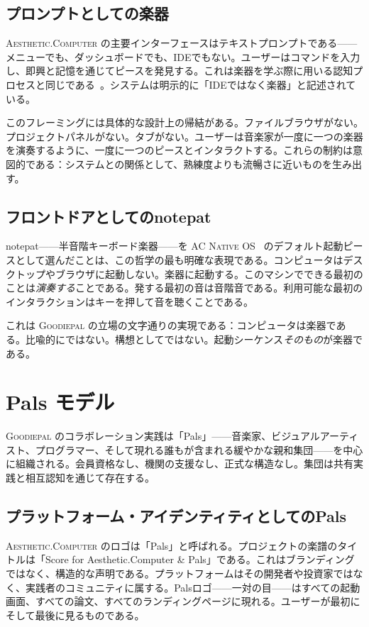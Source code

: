 \documentclass[10pt,letterpaper,twocolumn]{article}
\newcommand{\ac}{\textsc{Aesthetic.Computer}}
\newcommand{\acos}{\textsc{AC Native OS}}
\newcommand{\gp}{\textsc{Goodiepal}}
\begin{document}
\subsection{プロンプトとしての楽器}

\ac{} の主要インターフェースはテキストプロンプトである——メニューでも、ダッシュボードでも、IDEでもない。ユーザーはコマンドを入力し、即興と記憶を通じてピースを発見する。これは楽器を学ぶ際に用いる認知プロセスと同じである~\citep{scudder2026ac}。システムは明示的に「IDEではなく楽器」と記述されている。

このフレーミングには具体的な設計上の帰結がある。ファイルブラウザがない。プロジェクトパネルがない。タブがない。ユーザーは音楽家が一度に一つの楽器を演奏するように、一度に一つのピースとインタラクトする。これらの制約は意図的である：システムとの関係として、熟練度よりも流暢さに近いものを生み出す。

\subsection{フロントドアとしてのnotepat}

notepat——半音階キーボード楽器——を \acos{}~\citep{scudder2026notepat} のデフォルト起動ピースとして選んだことは、この哲学の最も明確な表現である。コンピュータはデスクトップやブラウザに起動しない。楽器に起動する。このマシンでできる最初のことは\emph{演奏する}ことである。発する最初の音は音階音である。利用可能な最初のインタラクションはキーを押して音を聴くことである。

これは \gp{} の立場の文字通りの実現である：コンピュータは楽器である。比喩的にではない。構想としてではない。起動シーケンス\emph{そのもの}が楽器である。

\section{Pals モデル}

\gp{} のコラボレーション実践は「Pals」——音楽家、ビジュアルアーティスト、プログラマー、そして現れる誰もが含まれる緩やかな親和集団——を中心に組織される。会員資格なし、機関の支援なし、正式な構造なし。集団は共有実践と相互認知を通じて存在する。

\subsection{プラットフォーム・アイデンティティとしてのPals}

\ac{} のロゴは「Pals」と呼ばれる。プロジェクトの楽譜のタイトルは「Score for Aesthetic.Computer \& Pals」である。これはブランディングではなく、構造的な声明である。プラットフォームはその開発者や投資家ではなく、実践者のコミュニティに属する。Palsロゴ——一対の目——はすべての起動画面、すべての論文、すべてのランディングページに現れる。ユーザーが最初にそして最後に見るものである。
\end{document}
